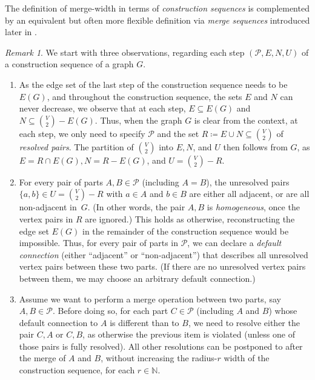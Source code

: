 \documentclass[11pt]{article}
\newcommand{\sz}[1]{\todo[color=pink!40]{sz: #1}}
\theoremstyle{remark}
\newtheorem{remark}[theorem]{Remark}
\newcommand{\set}[1]{\{#1\}}
\def\cal{\mathcal}
\def\N{\mathbb N}
\renewcommand{\subset}{\subseteq}
\renewcommand{\setminus}{-}
\begin{document}
The definition of merge-width in terms of
\emph{construction sequences} is complemented by an equivalent but often more flexible definition via \emph{merge sequences}
 introduced later in .


\begin{remark}\label{remark:maindef}
We start with three observations, regarding each step \((\cal P,E,N,U)\) of a construction sequence of a graph \(G\).

\begin{enumerate}[wide, labelwidth=!, labelindent=0pt]
  \item
        As the edge set of the last step of the construction sequence needs to be \(E(G)\), and
throughout the construction sequence, the sets $E$ and $N$ can never decrease,
        we observe that at each step, \(E \subseteq E(G)\) and \(N \subseteq {V\choose 2} \setminus E(G)\).
        Thus, when the graph \(G\) is clear from the context, at each step, we only need to specify \(\cal P\) and the set \(R\coloneqq E\cup N \subset {V \choose 2}\) of \emph{resolved pairs}.
        The partition of \(V\choose 2\) into \(E, N\), and \(U\) then follows from \(G\), as \(E=R\cap E(G), N = R \setminus E(G)\), and \(U={V\choose 2}-R\).
    \item
        For every pair of parts $A,B\in\cal P$ (including $A=B$), the unresolved pairs $\set{a,b}\in U={V\choose 2}-R$ with $a\in A$ and $b\in B$ are either all adjacent, or are all non-adjacent in~$G$.
        (In other words, the pair $A,B$ is  \emph{homogeneous}, once the vertex pairs in $R$ are ignored.)
        This holds as otherwise, reconstructing the edge set \(E(G)\) in the remainder of the construction sequence would be impossible.
        Thus, for every pair of parts in \(\cal P\), we can declare a \emph{default connection} (either ``adjacent'' or ``non-adjacent'') that
        describes all unresolved vertex pairs between these two parts.
        (If there are no unresolved vertex pairs between them, we may choose an arbitrary default connection.)
    \item
        Assume we want to perform a merge operation between two parts, say \(A,B \in \cal P\).
        Before doing so, for each part \(C\in\cal P\) (including $A$ and  $B$) whose default connection to \(A\) is different than to \(B\), we need to resolve either the pair \(C,A\) or \(C,B\),
        as otherwise the previous item is violated
        (unless one of those pairs is fully resolved).
        All other resolutions can be postponed to after the merge of $A$ and $B$, without increasing the radius-$r$ width of the construction sequence, for each $r\in\N$. %


\end{enumerate}
\end{remark}
\end{document}
